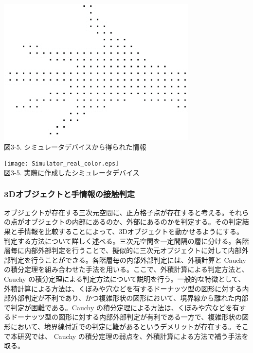\begin{center}
  \includegraphics[width=10cm]{Simulator_getInfo.eps} \\

 \vspace{1mm}
  図3-5. シミュレータデバイスから得られた情報
\end{center}

 \vspace{10mm}
\begin{center}
  \texttt{[image: Simulator\_real\_color.eps]} \\

 \vspace{1mm}
  図3-5. 実際に作成したシミュレータデバイス
\end{center}

\subsubsection{3Dオブジェクトと手情報の接触判定}
オブジェクトが存在する三次元空間に、正方格子点が存在すると考える。それらの点がオブジェクトの内部にあるのか、外部にあるのかを判定する。その判定結果と手情報を比較することによって、3Dオブジェクトを動かせるようにする。判定する方法について詳しく述べる。三次元空間を一定間隔の層に分ける。各階層毎に内部外部判定を行うことで、擬似的に三次元オブジェクトに対して内部外部判定を行うことができる。各階層毎の内部外部判定には、外積計算と Cauchy の積分定理を組み合わせた手法を用いる。ここで、外積計算による判定方法と、 Cauchy の積分定理による判定方法について説明を行う。一般的な特徴として、外積計算による方法は、くぼみや穴などを有するドーナッツ型の図形に対する内部外部判定が不利であり、かつ複雑形状の図形において、境界線から離れた内部で判定が困難である。Cauchy の積分定理による方法は、くぼみや穴などを有するドーナッツ型の図形に対する内部外部判定が有利である一方で、複雑形状の図形において、境界線付近での判定に難があるというデメリットが存在する。そこで本研究では、 Cauchy の積分定理の弱点を、外積計算による方法で補う手法を取る。






















